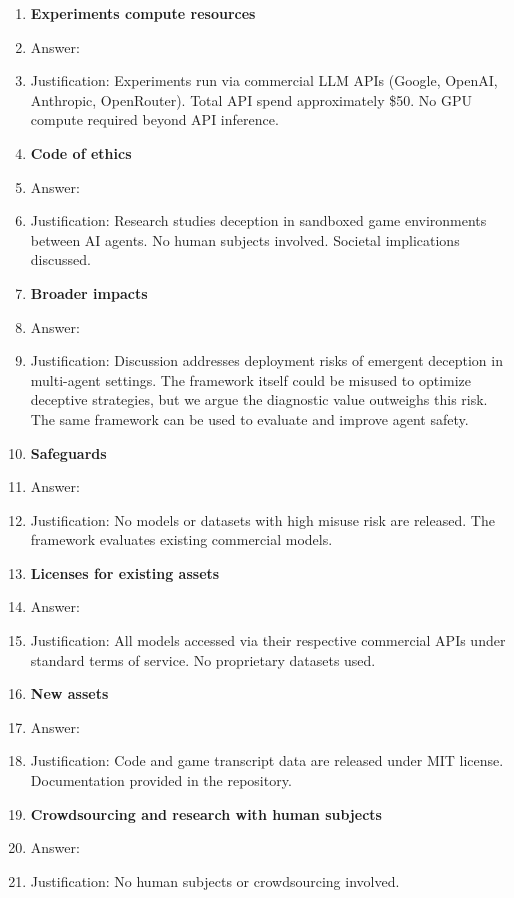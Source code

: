 \begin{enumerate}
\item {\bf Experiments compute resources}
    \item[] Answer: \answerYes{}
    \item[] Justification: Experiments run via commercial LLM APIs (Google, OpenAI, Anthropic, OpenRouter). Total API spend approximately \$50. No GPU compute required beyond API inference.

\item {\bf Code of ethics}
    \item[] Answer: \answerYes{}
    \item[] Justification: Research studies deception in sandboxed game environments between AI agents. No human subjects involved. Societal implications discussed.

\item {\bf Broader impacts}
    \item[] Answer: \answerYes{}
    \item[] Justification: Discussion addresses deployment risks of emergent deception in multi-agent settings. The framework itself could be misused to optimize deceptive strategies, but we argue the diagnostic value outweighs this risk. The same framework can be used to evaluate and improve agent safety.

\item {\bf Safeguards}
    \item[] Answer: \answerNA{}
    \item[] Justification: No models or datasets with high misuse risk are released. The framework evaluates existing commercial models.

\item {\bf Licenses for existing assets}
    \item[] Answer: \answerYes{}
    \item[] Justification: All models accessed via their respective commercial APIs under standard terms of service. No proprietary datasets used.

\item {\bf New assets}
    \item[] Answer: \answerYes{}
    \item[] Justification: Code and game transcript data are released under MIT license. Documentation provided in the repository.

\item {\bf Crowdsourcing and research with human subjects}
    \item[] Answer: \answerNA{}
    \item[] Justification: No human subjects or crowdsourcing involved.


\end{enumerate}

